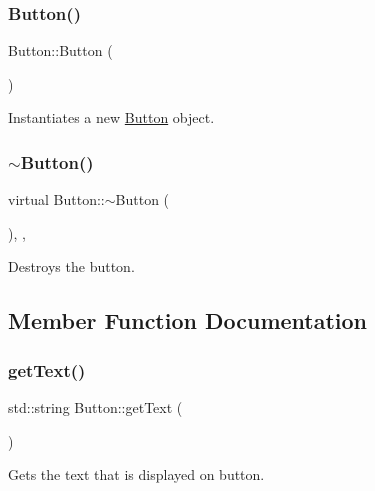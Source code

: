 \subsubsection{\texorpdfstring{Button()}{Button()}}
{\footnotesize\ttfamily Button\+::\+Button (\begin{DoxyParamCaption}{ }\end{DoxyParamCaption})}



Instantiates a new \mbox{\hyperlink{class_button}{Button}} object. 

\mbox{\label{class_button_af051ff5b71d12edf514478a68a334d27}} 
\subsubsection{\texorpdfstring{$\sim$Button()}{~Button()}}
{\footnotesize\ttfamily virtual Button\+::$\sim$\+Button (\begin{DoxyParamCaption}{ }\end{DoxyParamCaption})\hspace{0.3cm}{\ttfamily [inline]}, {\ttfamily [override]}, {\ttfamily [virtual]}}



Destroys the button. 



\subsection{Member Function Documentation}
\mbox{\label{class_button_afd57748d0bd0f5fa35d765052d281169}} 
\subsubsection{\texorpdfstring{getText()}{getText()}}
{\footnotesize\ttfamily std\+::string Button\+::get\+Text (\begin{DoxyParamCaption}{ }\end{DoxyParamCaption})}



Gets the text that is displayed on button. 

\mbox{\label{class_button_afdb39226fa5833cdbbd6d061783024b7}} 
